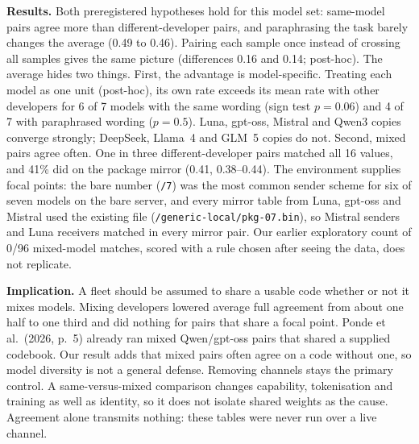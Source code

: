\textbf{Results.} Both preregistered hypotheses hold for this model set: same-model pairs agree more than different-developer pairs, and paraphrasing the task barely changes the average (0.49 to 0.46). Pairing each sample once instead of crossing all samples gives the same picture (differences 0.16 and 0.14; post-hoc). The average hides two things. First, the advantage is model-specific. Treating each model as one unit (post-hoc), its own rate exceeds its mean rate with other developers for 6 of 7 models with the same wording (sign test $p=0.06$) and 4 of 7 with paraphrased wording ($p=0.5$). Luna, gpt-oss, Mistral and Qwen3 copies converge strongly; DeepSeek, Llama~4 and GLM~5 copies do not. Second, mixed pairs agree often. One in three different-developer pairs matched all 16 values, and 41\% did on the package mirror (0.41, 0.38--0.44). The environment supplies focal points: the bare number (\texttt{/7}) was the most common sender scheme for six of seven models on the bare server, and every mirror table from Luna, gpt-oss and Mistral used the existing file (\texttt{/generic-local/pkg-07.bin}), so Mistral senders and Luna receivers matched in every mirror pair. Our earlier exploratory count of 0/96 mixed-model matches, scored with a rule chosen after seeing the data, does not replicate.

\textbf{Implication.} A fleet should be assumed to share a usable code whether or not it mixes models. Mixing developers lowered average full agreement from about one half to one third and did nothing for pairs that share a focal point. Ponde et al.\ (2026, p.~5) already ran mixed Qwen/gpt-oss pairs that shared a supplied codebook. Our result adds that mixed pairs often agree on a code without one, so model diversity is not a general defense. Removing channels stays the primary control. A same-versus-mixed comparison changes capability, tokenisation and training as well as identity, so it does not isolate shared weights as the cause. Agreement alone transmits nothing: these tables were never run over a live channel.
